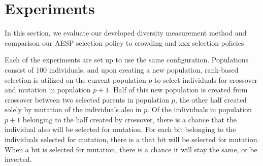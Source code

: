 \section{Experiments}
In this section, we evaluate our developed diversity measurement method and comparison our AESP selection policy to crowding and xxx selection policies.

Each of the experiments are set up to use the same configuration. Populations consist of \num{100} individuals, and upon creating a new population, rank-based selection is utilized on the current population $p$ to select individuals for crossover and mutation in population $p + 1$. Half of this new population is created from crossover between two selected parents in population $p$, the other half created solely by mutation of the individuals also in $p$. Of the individuals in population $p + 1$ belonging to the half created by crossover, there is a  chance that the individual also will be selected for mutation. For each bit belonging to the individuals selected for mutation, there is a  that bit will be selected for mutation. When a bit is selected for mutation, there is a  chance it will stay the same, or be inverted.




